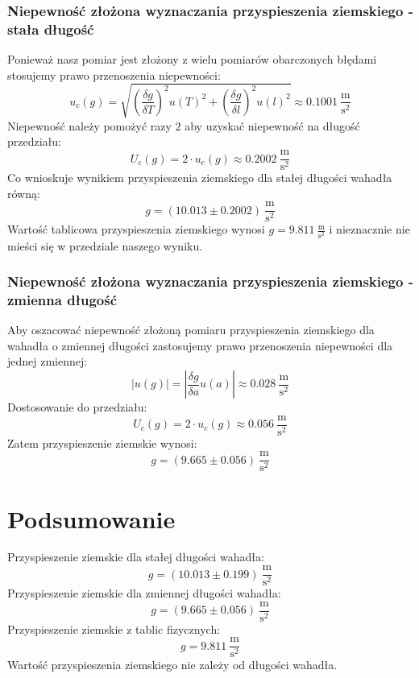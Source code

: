 \documentclass[a4paper,12pts]{article}
\begin{document}
	\subsubsection{Niepewność złożona wyznaczania przyspieszenia ziemskiego - stała długość}
	Ponieważ nasz pomiar jest złożony z wielu pomiarów obarczonych błędami stosujemy prawo przenoszenia niepewności:
	\begin{equation}
		u_c(g) = \sqrt{\left(\frac{\delta g}{\delta T}\right)^2 u(T)^2 + \left(\frac{\delta g}{\delta l}\right)^2 u(l)^2} \approx 0.1001 ~\frac{\textrm{m}}{\textrm{s}^2}
	\end{equation}
	Niepewność należy pomożyć razy $2$ aby uzyskać niepewność na długość przedziału:
	\begin{equation}
	U_c(g) = 2 \cdot u_c(g) \approx 0.2002 ~\frac{\textrm{m}}{\textrm{s}^2}
	\end{equation}
	Co wnioskuje wynikiem przyspieszenia ziemskiego dla stałej długości wahadła równą:
	$$ g = (10.013 \pm 0.2002) ~\frac{\textrm{m}}{\textrm{s}^2} $$
	Wartość tablicowa przyspieszenia ziemskiego wynosi $g = 9.811 ~\frac{\textrm{m}}{\textrm{s}^2}$ i nieznacznie nie mieści się w przedziale naszego wyniku.
	
	\subsubsection{Niepewność złożona wyznaczania przyspieszenia ziemskiego - zmienna długość}
	Aby oszacować niepewność złożoną pomiaru przyspieszenia ziemskiego dla wahadła o zmiennej długości zastosujemy prawo przenoszenia niepewności dla jednej zmiennej:
	\begin{equation}
		|u(g)| = \left|\frac{\delta g}{\delta a} u(a)\right| \approx 0.028 ~\frac{\textrm{m}}{\textrm{s}^2}
	\end{equation}
	Dostosowanie do przedziału:
	\begin{equation}
		U_c(g) = 2 \cdot u_c(g) \approx 0.056 ~\frac{\textrm{m}}{\textrm{s}^2}
	\end{equation}
	Zatem przyspieszenie ziemskie wynosi:
	$$g = (9.665 \pm 0.056) ~\frac{\textrm{m}}{\textrm{s}^2}$$

	\section{Podsumowanie}
	Przyspieszenie ziemskie dla stałej długości wahadła:
	$$ g = (10.013 \pm 0.199) ~\frac{\textrm{m}}{\textrm{s}^2} $$
	Przyspieszenie ziemskie dla zmiennej długości wahadła:
	$$ g = (9.665 \pm 0.056) ~\frac{\textrm{m}}{\textrm{s}^2} $$
	Przyspieszenie ziemskie z tablic fizycznych:
	$$ g = 9.811 ~\frac{\textrm{m}}{\textrm{s}^2} $$
	Wartość przyspieszenia ziemskiego nie zależy od długości wahadła.
\end{document}
